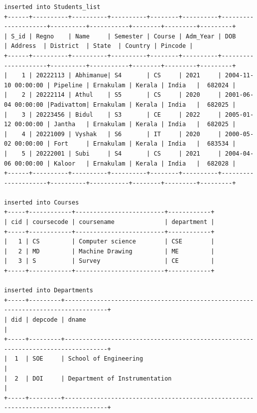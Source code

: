 \documentclass{article}
\begin{document}
\fontsize{7pt}{7pt}\selectfont
\begin{verbatim}
inserted into Students_list
+------+----------+----------+----------+--------+----------+---------------------+----------+-----------+--------+---------+---------+
| S_id | Regno    | Name     | Semester | Course | Adm_Year | DOB                 | Address  | District  | State  | Country | Pincode |
+------+----------+----------+----------+--------+----------+---------------------+----------+-----------+--------+---------+---------+
|    1 | 20222113 | Abhimanue| S4       | CS     | 2021     | 2004-11-10 00:00:00 | Pipeline | Ernakulam | Kerala | India   |  682024 |
|    2 | 20222114 | Athul    | S5       | CS     | 2020     | 2001-06-04 00:00:00 |Padivattom| Ernakulam | Kerala | India   |  682025 |
|    3 | 20223456 | Bidul    | S3       | CE     | 2022     | 2005-01-12 00:00:00 | Jantha   | Ernakulam | Kerala | India   |  682025 |
|    4 | 20221009 | Vyshak   | S6       | IT     | 2020     | 2000-05-02 00:00:00 | Fort     | Ernakulam | Kerala | India   |  683534 |
|    5 | 20222001 | Subi     | S4       | CS     | 2021     | 2004-04-06 00:00:00 | Kaloor   | Ernakulam | Kerala | India   |  682028 |
+------+----------+----------+----------+--------+----------+---------------------+----------+-----------+--------+---------+---------+

inserted into Courses
+-----+------------+-------------------------+------------+
| cid | coursecode | coursename              | department |
+-----+------------+-------------------------+------------+
|   1 | CS         | Computer science        | CSE        |
|   2 | MD         | Machine Drawing         | ME         |
|   3 | S          | Survey                  | CE         |
+-----+------------+-------------------------+------------+

inserted into Departments
+-----+---------+----------------------------------------------------------------------------------+
| did | depcode | dname                                                                            |
+-----+---------+----------------------------------------------------------------------------------+                              
|  1  | SOE     | School of Engineering                                                            |
|  2  | DOI     | Department of Instrumentation                                                    |
+-----+---------+----------------------------------------------------------------------------------+


\end{verbatim}
\fontsize{12pt}{12pt}\selectfont
\end{document}
